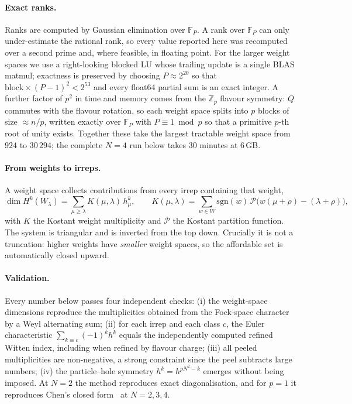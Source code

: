 \documentclass[10pt]{article}
\begin{document}
\paragraph{Exact ranks.}
Ranks are computed by Gaussian elimination over $\mathbb F_P$. A rank over $\mathbb F_P$ can only under-estimate the rational rank, so every value reported here was recomputed over a second prime and, where feasible, in floating point. For the larger weight spaces we use a right-looking blocked LU whose trailing update is a single BLAS matmul; exactness is preserved by choosing $P\approx2^{20}$ so that $\text{block}\times(P-1)^2<2^{53}$ and every float64 partial sum is an exact integer. A further factor of $p^2$ in time and memory comes from the $\mathbb Z_p$ flavour symmetry: $Q$ commutes with the flavour rotation, so each weight space splits into $p$ blocks of size $\approx n/p$, written exactly over $\mathbb F_P$ with $P\equiv1\bmod p$ so that a primitive $p$-th root of unity exists. Together these take the largest tractable weight space from $924$ to $30\,294$; the complete $N=4$ run below takes $30$ minutes at $6$\,GB.

\paragraph{From weights to irreps.}
A weight space collects contributions from every irrep containing that weight,
\begin{equation}
\dim H^k(W_\lambda)=\sum_{\mu\ge\lambda}K(\mu,\lambda)\,h^k_\mu,\qquad
K(\mu,\lambda)=\sum_{w\in W}\mathrm{sgn}(w)\,\mathcal P\big(w(\mu+\rho)-(\lambda+\rho)\big),
\end{equation}
with $K$ the Kostant weight multiplicity and $\mathcal P$ the Kostant partition function. The system is triangular and is inverted from the top down. Crucially it is not a truncation: higher weights have \emph{smaller} weight spaces, so the affordable set is automatically closed upward.

\paragraph{Validation.}
Every number below passes four independent checks: (i) the weight-space dimensions reproduce the multiplicities obtained from the Fock-space character by a Weyl alternating sum; (ii) for each irrep and each class $c$, the Euler characteristic $\sum_{k\equiv c}(-1)^kh^k$ equals the independently computed refined Witten index, including when refined by flavour charge; (iii) all peeled multiplicities are non-negative, a strong constraint since the peel subtracts large numbers; (iv) the particle--hole symmetry $h^k=h^{pN^2-k}$ emerges without being imposed. At $N=2$ the method reproduces exact diagonalisation, and for $p=1$ it reproduces Chen's closed form~\cite[(2.21)--(2.22)]{Chen:2025fortuity} at $N=2,3,4$.
\end{document}
